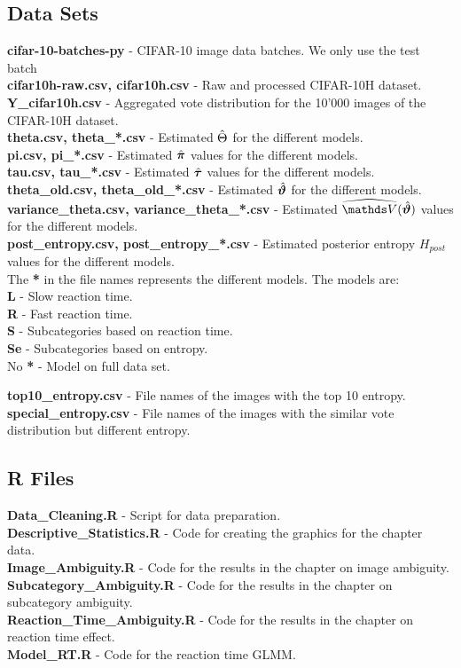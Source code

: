 \subsection*{Data Sets}
\textbf{cifar-10-batches-py} - CIFAR-10 image data batches. We only use the test batch\\
\textbf{cifar10h-raw.csv, cifar10h.csv} - Raw and processed CIFAR-10H dataset. \\
\textbf{Y\_cifar10h.csv} - Aggregated vote distribution for the 10'000 images of the CIFAR-10H dataset. \\

\textbf{theta.csv, theta\_*.csv} - Estimated $\hat{\Theta}$ for the different models. \\
\textbf{pi.csv, pi\_*.csv} - Estimated $\hat{\bm{\pi}}$ values for the different models. \\
\textbf{tau.csv, tau\_*.csv} - Estimated $\hat{\bm{\tau}}$ values for the different models. \\
\textbf{theta\_old.csv, theta\_old\_*.csv} - Estimated $\hat{\bm{\vartheta}}$ for the different models. \\
\textbf{variance\_theta.csv, variance\_theta\_*.csv} - Estimated $\widehat{\V}(\hbvtheta)$ values for the different models. \\
\textbf{post\_entropy.csv, post\_entropy\_*.csv} - Estimated posterior entropy $H_{post}$ values for the different models. \\

The \textbf{*} in the file names represents the different models. The models are: \\
\textbf{L} - Slow reaction time. \\
\textbf{R} - Fast reaction time. \\
\textbf{S} - Subcategories based on reaction time. \\
\textbf{Se} - Subcategories based on entropy. \\
No \textbf{*} - Model on full data set.

\textbf{top10\_entropy.csv} - File names of the images with the top 10 entropy. \\
\textbf{special\_entropy.csv} - File names of the images with the similar vote distribution but different entropy. \\


\subsection*{R Files}
\textbf{Data\_Cleaning.R} - Script for data preparation.\\
\textbf{Descriptive\_Statistics.R} - Code for creating the graphics for the chapter data. \\
\textbf{Image\_Ambiguity.R} - Code for the results in the chapter on image ambiguity. \\
\textbf{Subcategory\_Ambiguity.R} - Code for the results in the chapter on subcategory ambiguity. \\
\textbf{Reaction\_Time\_Ambiguity.R} - Code for the results in the chapter on reaction time effect. \\
\textbf{Model\_RT.R} - Code for the reaction time GLMM. \\

